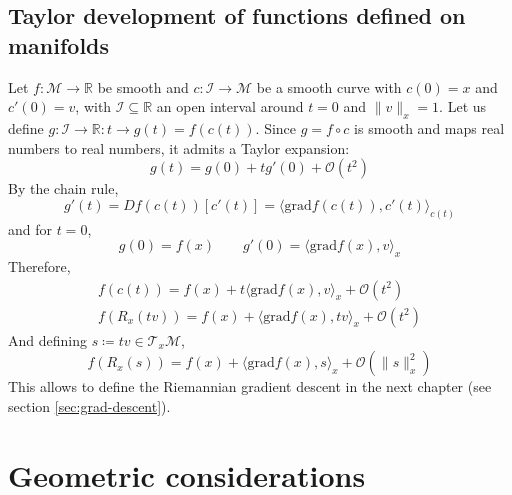 \documentclass[12pt, openany]{report}
\newcommand{\R}{\mathbb{R}}
\newcommand{\M}{\mathcal{M}}
\renewcommand{\O}{\mathcal{O}}
\theoremstyle{definition}
\begin{document}
\subsection{Taylor development of functions defined on manifolds}
Let $f:\M\to \R$ be smooth and $c:\mathcal{I}\to \mathcal{M}$ be a smooth curve with $c(0)=x$ and $c'(0)=v$, with $\mathcal{I}\subseteq \R$ an open interval around $t=0$ and $\|v\|_x = 1$. Let us define $g:\mathcal{I}\to \R:t\to g(t) = f(c(t))$. Since $g=f\circ c$ is smooth and maps real numbers to real numbers, it admits a Taylor expansion:
\begin{equation}
	g(t) = g(0) + tg'(0) + \mathcal{O}(t^2)
\end{equation}
By the chain rule, 
\begin{equation}
	g'(t) = Df(c(t))[c'(t)] = \langle \text{grad}f(c(t)), c'(t)\rangle_{c(t)}
\end{equation}
and for $t=0$, 
\begin{equation}
	g(0) = f(x)\qquad g'(0) = \langle \text{grad}f(x), v\rangle_x
\end{equation}
Therefore, 
\begin{equation}
	\begin{aligned}
		f(c(t)) = f(x) + t\langle \text{grad}f(x), v\rangle_x + \mathcal{O}(t^2)\\
		f(R_x(tv)) = f(x) + \langle \text{grad}f(x), tv\rangle_x + \mathcal{O}(t^2)
	\end{aligned}
\end{equation}
And defining $s\coloneqq tv \in \mathcal{T}_x\M$, 
\begin{equation}
	f(R_x(s)) = f(x) + \langle \text{grad}f(x),s\rangle_x + \O(\|s\|_x^2)
\end{equation}
This allows to define the Riemannian gradient descent in the next chapter (see section \ref{sec:grad-descent}).
\section{Geometric considerations}
\end{document}
